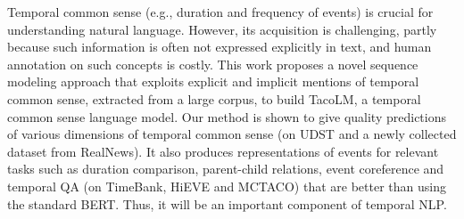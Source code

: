 Temporal common sense (e.g., duration and frequency of events) is crucial for understanding natural language. However, its acquisition is challenging, partly because such information is often not expressed explicitly in text, and human annotation on such concepts is costly. This work proposes a novel sequence modeling approach that exploits explicit and implicit mentions of temporal common sense, extracted from a large corpus, to build TacoLM, a temporal common sense language model. Our method is shown to give quality predictions of various dimensions of temporal common sense (on UDST and a newly collected dataset from RealNews). It also produces representations of events for relevant tasks such as duration comparison, parent-child relations, event coreference and temporal QA (on TimeBank, HiEVE and MCTACO) that are better than using the standard BERT. Thus, it will be an important component of temporal NLP.
